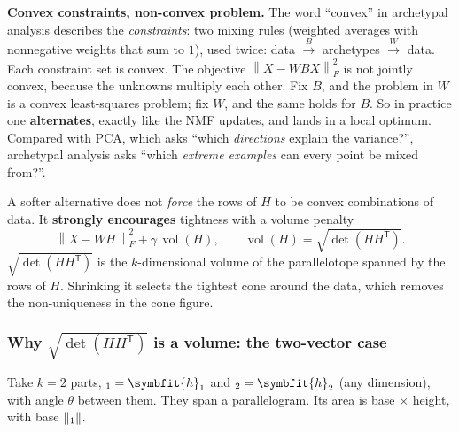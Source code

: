 \documentclass[11pt]{article}
\newcommand{\bm}[1]{\symbfit{#1}}
\let\vv\relax\newcommand{\vv}{\bm{v}}
\newcommand{\vh}{\bm{h}}
\newcommand{\T}{^{\mathsf T}}
\newcommand{\norm}[1]{\left\lVert #1\right\rVert}
\newcommand{\Fro}[1]{\left\lVert #1\right\rVert_F}
\begin{document}
\begin{intuition}
\textbf{Convex constraints, non-convex problem.} The word ``convex'' in archetypal analysis
describes the \emph{constraints}: two mixing rules (weighted averages with nonnegative weights that
sum to $1$), used twice:
data $\xrightarrow{\ B\ }$ archetypes $\xrightarrow{\ W\ }$ data. Each constraint set is convex.
The objective $\Fro{X-WBX}^2$ is not jointly convex, because the unknowns multiply each other.
Fix $B$, and the problem in $W$ is a convex least-squares problem; fix $W$, and the same holds for $B$.
So in practice one \textbf{alternates}, exactly like the NMF updates, and lands in a local
optimum. Compared with PCA, which asks ``which \emph{directions} explain the variance?'',
archetypal analysis asks ``which \emph{extreme examples} can every point be mixed from?''.
\end{intuition}

\begin{deeper}
A softer alternative does not \emph{force} the rows of $H$ to be convex combinations
of data. It \textbf{strongly encourages} tightness with a volume penalty
\[
\Fro{X-WH}^2+\gamma\,\operatorname{vol}(H),\qquad \operatorname{vol}(H)=\sqrt{\det(HH\T)} .
\]
$\sqrt{\det(HH\T)}$ is the $k$-dimensional volume of the parallelotope spanned by the
rows of $H$. Shrinking it selects the tightest cone around the data, which removes the
non-uniqueness in the cone figure.
\end{deeper}

\subsubsection*{Why $\sqrt{\det(HH\T)}$ is a volume: the two-vector case}

Take $k=2$ parts, $\vv_1=\vh_1$ and $\vv_2=\vh_2$ (any dimension), with angle $\theta$ between them. They span a
parallelogram. Its area is base $\times$ height, with base $\norm{\vv_1}$.
\end{document}
